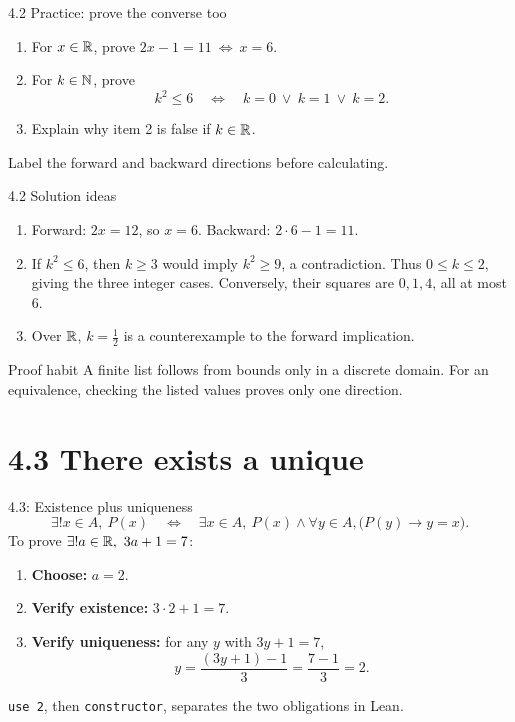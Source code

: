 \begin{frame}{4.2 Practice: prove the converse too}
\begin{enumerate}
\item For $x\in\mathbb{R}$, prove $2x-1=11\ \Longleftrightarrow\ x=6$.
\item For $k\in\mathbb{N}$, prove
\[
k^2\le6\quad\Longleftrightarrow\quad k=0\ \lor\ k=1\ \lor\ k=2.
\]
\item Explain why item 2 is false if $k\in\mathbb{R}$.
\end{enumerate}
Label the forward and backward directions before calculating.
\end{frame}

\begin{frame}{4.2 Solution ideas}
\begin{enumerate}
\item Forward: $2x=12$, so $x=6$. Backward: $2\cdot6-1=11$.
\item If $k^2\le6$, then $k\ge3$ would imply $k^2\ge9$, a contradiction. Thus $0\le k\le2$, giving the three integer cases. Conversely, their squares are $0,1,4$, all at most $6$.
\item Over $\mathbb{R}$, $k=\tfrac12$ is a counterexample to the forward implication.
\end{enumerate}
\begin{block}{Proof habit}
A finite list follows from bounds only in a discrete domain. For an equivalence, checking the listed values proves only one direction.
\end{block}
\end{frame}

\section{4.3 There exists a unique}
\begin{frame}{4.3: Existence plus uniqueness}
\[
\exists!x\in A,\ P(x)
\quad\Longleftrightarrow\quad
\exists x\in A,\ P(x)\land\forall y\in A,\bigl(P(y)\to y=x\bigr).
\]
To prove $\exists!a\in\mathbb{R},\ 3a+1=7$:
\begin{enumerate}
\item \textbf{Choose:} $a=2$.
\item \textbf{Verify existence:} $3\cdot2+1=7$.
\item \textbf{Verify uniqueness:} for any $y$ with $3y+1=7$,
\[
y=\frac{(3y+1)-1}{3}=\frac{7-1}{3}=2.
\]
\end{enumerate}
\texttt{use 2}, then \texttt{constructor}, separates the two obligations in Lean.
\end{frame}

